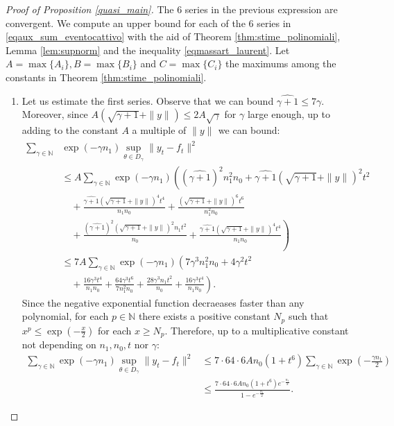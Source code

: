 \documentclass{article}
\theoremstyle{definition}
\theoremstyle{remark}
\numberwithin{equation}{section}
\newcommand{\N}{\mathbb{N}}
\newcommand{\norm}[2]{
    \|#1\|_{#2}
}
\begin{document}
\begin{proof}[Proof of Proposition \ref{quasi_main}]
    The 6 series in the previous expression are convergent.
    We compute an upper bound for each of the 6 series in \eqref{eqaux_sum_eventocattivo} with the aid of Theorem \ref{thm:stime_polinomiali}, Lemma \ref{lem:supnorm} and the inequality \eqref{eqmassart_laurent}.
    Let $A = \max\{A_i\}, B = \max\{B_i\}$ and $C = \max\{C_i\}$ the maximums among the constants in Theorem \ref{thm:stime_polinomiali}.
    \begin{enumerate}
        \item Let us estimate the first series.
        Observe that we can bound $\widehat{\gamma+1} \le 7\gamma$.
        Moreover, since $A(\sqrt{\gamma+1} +\norm{y}{}) \le 2A\sqrt{\gamma}$ for $\gamma$ large enough, up to adding to the constant $A$ a multiple of $\norm{y}{}$ we can bound:
        \begin{align}
            \sum_{\gamma \in \N}&\exp(-\gamma n_1) \sup_{\theta \in D_\gamma}\norm{y_t-f_t}{}^2 \\
            &\le A\sum_{\gamma \in \N}\exp(-\gamma n_1)\left((\widehat{\gamma+1})^2n_1^2n_0 +\widehat{\gamma+1}(\sqrt{\gamma+1}+\norm{y}{})^2 t^2 \right.\\
            &\left.\quad + \frac{\widehat{\gamma+1}(\sqrt{\gamma+1}+\norm{y}{})^4t^4}{n_1n_0} + \frac{(\sqrt{\gamma+1}+\norm{y}{})^6t^6}{n_1^2n_0} \right.\\
            &\left.\quad + \frac{(\widehat{\gamma+1})^2(\sqrt{\gamma+1}+\norm{y}{})^2n_1t^2}{n_0} + \frac{\widehat{\gamma+1}(\sqrt{\gamma+1}+\norm{y}{})^4t^4}{n_1n_0}\right)\\
            &\le 7A\sum_{\gamma \in \N}\exp(-\gamma n_1)\left(7\gamma^3 n_1^2n_0 +4\gamma^2 t^2 \right.\\
            &\left.\quad + \frac{16\gamma^3t^4}{n_1n_0} + \frac{64\gamma^3t^6}{7n_1^2n_0} + \frac{28\gamma^3n_1t^2}{n_0} + \frac{16\gamma^3t^4}{n_1n_0}\right).
        \end{align}
        Since the negative exponential function decraeases faster than any polynomial, for each $p\in \N$ there exists a positive constant $N_p$ such that $x^p\le \exp(-\frac{x}{2})$ for each $x\ge N_p$.
        Therefore, up to a multiplicative constant not depending on $n_1,n_0,t$ nor $\gamma$:
        \begin{align}
            \sum_{\gamma \in \N}\exp(-\gamma n_1) \sup_{\theta \in D_\gamma}\norm{y_t-f_t}{}^2 &\le 7\cdot 64 \cdot 6An_0(1+t^6)\sum_{\gamma \in \N}\exp(-\frac{\gamma n_1}{2}) \\
            &\le \frac{7\cdot 64 \cdot 6An_0(1+t^6) e^{-\frac{n_1}{2}}}{1-e^{-\frac{n_1}{2}}}.
        \end{align}


\end{enumerate}
\end{proof}
\end{document}
